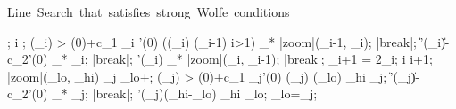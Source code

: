 \begin{algorithm}
    \mbox{Line Search that satisfies strong Wolfe conditions}
    \begin{program}
        \BEGIN
        ;
        i ;
         \DO
        \IF \phi(\alpha_i) > \phi(0)+c_1 \alpha_i \phi'(0) \OR
            (\phi(\alpha_i) \ge \phi(\alpha_{i-1}) \AND i>1)
        \THEN
            \alpha_* \leftarrow |zoom|(\alpha_{i-1}, \alpha_i);
            |break|;
        \FI
        \IF \|\phi'(\alpha_i)\| \le -c_2\phi'(0)
        \THEN
            \alpha_* \leftarrow \alpha_i;
            |break|;
        \FI
        \IF \phi'(\alpha_i) 
        \THEN
            \alpha_* \leftarrow |zoom|(\alpha_i, \alpha_{i-1});
            |break|;
        \FI
        \alpha_{i+1} = 2\alpha_i;
        i \leftarrow i+1;
        \OD
        \WHERE
        \FUNCT |zoom|(\alpha_{lo}, \alpha_{hi}) \BODY
             \DO
                \EXP \alpha_j \leftarrow \alpha_{lo}+;
                \IF \phi(\alpha_j) > \phi(0)+c_1 \alpha_j\phi'(0) \OR %
                    \phi(\alpha_j) \ge \phi(\alpha_{lo})
                \THEN
                    \alpha_{hi} \leftarrow \alpha_j;
                \ELSE
                    \IF \|\phi'(\alpha_j)\| \le -c_2\phi'(0)
                    \THEN
                        \alpha_* \leftarrow \alpha_j;
                        |break|;
                    \FI
                    \IF \phi'(\alpha_j)(\alpha_{hi}-\alpha_{lo}) 
                    \THEN
                        \alpha_{hi} \leftarrow \alpha_{lo};
                    \FI
                    \alpha_{lo}=\alpha_j;
                \FI
            \OD
            \ENDEXP \ENDFUNCT
        \END
    \end{program}
\end{algorithm}

